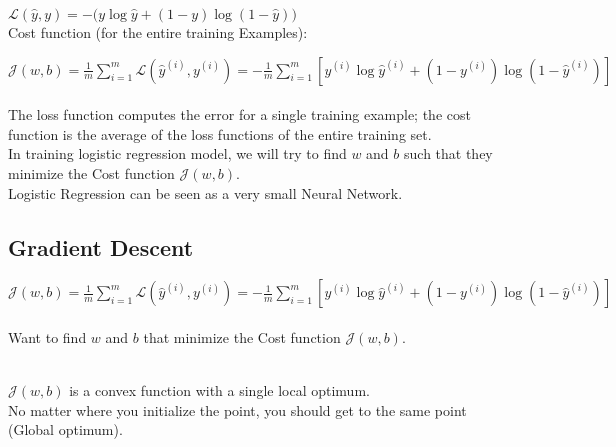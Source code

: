 \documentclass{article}
\begin{document}
    $\displaystyle \mathcal{L}(\hat{y}, y) = -(y\log{\hat{y}} + (1-y)\log{(1-\hat{y}))}$\\

    Cost function (for the entire training Examples):

    $\displaystyle \mathcal{J}(w, b) = \frac{1}{m}\sum_{i=1}^{m} \mathcal{L}(\hat{y}^{(i)}, y^{(i)}) = -\frac{1}{m}\sum_{i=1}^{m} [y^{(i)}\log{\hat{y}^{(i)}} + (1-y^{(i)})\log{(1-\hat{y}^{(i)})}]$\\\\

    The loss function computes the error for a single training example; the cost function is the average of the loss functions of the entire training set.\\

    In training logistic regression model, we will try to find $w$ and $b$ such that they minimize the Cost function $\mathcal{J}(w, b)$.\\

    Logistic Regression can be seen as a very small Neural Network.\\


\newpage
\subsection{Gradient Descent}

    $\displaystyle \mathcal{J}(w, b) = \frac{1}{m}\sum_{i=1}^{m} \mathcal{L}(\hat{y}^{(i)}, y^{(i)}) = -\frac{1}{m}\sum_{i=1}^{m} [y^{(i)}\log{\hat{y}^{(i)}} + (1-y^{(i)})\log{(1-\hat{y}^{(i)})}]$\\\\

    Want to find $w$ and $b$ that minimize the Cost function $\mathcal{J}(w,b)$.

    \\

    $\mathcal{J}(w,b)$ is a convex function with a single local optimum.\\
    No matter where you initialize the point, you should get to the same point (Global optimum).\\
\end{document}
